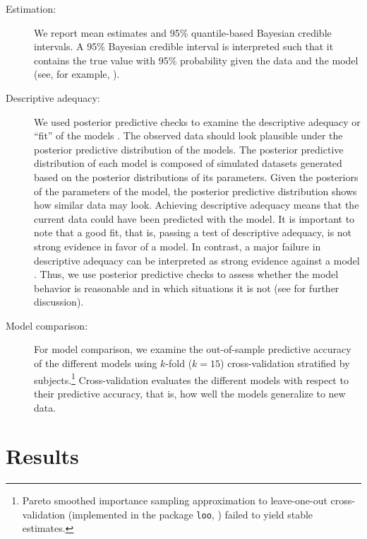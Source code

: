 \begin{description}
\item[Estimation:] We report mean estimates and 95\% quantile-based Bayesian credible intervals. A 95\% Bayesian credible interval is interpreted such that it contains the true value with 95\% probability given the data and the model (see, for example, \citealt{Jaynes1976, MoreyEtAl2015}).

\item[Descriptive adequacy:] We used posterior predictive checks to examine the descriptive adequacy or \enquote{fit} of the models \citep{shiffrinSurveyModelEvaluation2008}. The observed data should look plausible under the posterior predictive distribution of the models. The posterior predictive distribution of each model is composed of simulated datasets generated based on the posterior distributions of its parameters. Given the posteriors of the parameters of the model, the posterior predictive distribution shows how similar data may look. Achieving descriptive adequacy means that the current data could have been predicted with the model. It is important to note that a good fit, that is, passing a test of descriptive adequacy, is not strong evidence in favor of a model. In contrast, a major failure in descriptive adequacy can be interpreted as strong evidence against a model \citep{shiffrinSurveyModelEvaluation2008}. Thus, we use posterior predictive checks to assess whether the model behavior is reasonable and in which situations it is not (see \citealt{gelmanBayesianDataAnalysis2013} for further discussion).

\item[Model comparison:] For model comparison, we examine the out-of-sample predictive accuracy of the different models using $k$-fold ($k=15$) cross-validation stratified by subjects.\footnote{Pareto smoothed importance sampling approximation to leave-one-out cross-validation (implemented in the package \texttt{loo}, \citealt{vehtariParetoSmoothedImportance2015, vehtariPracticalBayesianModel2017}) failed to yield stable estimates.} Cross-validation evaluates the different models with respect to their predictive accuracy, that is, how well the models generalize to new data.
\end{description}

\section{Results}\label{sec:results}

